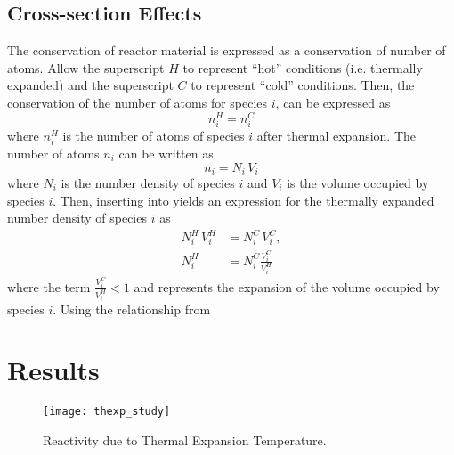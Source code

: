   \subsection{Cross-section Effects}
    The conservation of reactor material is expressed as a conservation of 
    number of atoms. Allow the superscript $H$ to represent ``hot'' conditions 
    (i.e.  thermally expanded) and the superscript $C$ to represent ``cold'' 
    conditions.  Then, the conservation of the number of atoms for species $i$, 
    can be expressed as
    \begin{equation}
      \label{eq:conservation}
      n_i^H = n_i^C 
    \end{equation}
    where $n_i^H$ is the number of atoms of species $i$ after thermal expansion.
    The number of atoms $n_i$ can be written as 
    \begin{equation}
      \label{eq:nden_definition}
      n_i = N_i \, V_i
    \end{equation}
    where $N_i$ is the number density of species $i$ and $V_i$ is the volume
    occupied by species $i$. Then, inserting  into 
     yields an expression for the thermally expanded 
    number density of species $i$ as
    \begin{align}
      N_i^H \, V_i^H &= N_i^C \, V_i^C, \\
      N_i^H &= N_i^C \frac{V_i^C}{V_i^H}
    \end{align}
    where the term $\frac{V_i^C}{V_i^H} < 1$ and represents the expansion of the
    volume occupied by species $i$. Using the relationship from


\section{Results}
  \begin{figure}
    \centering
    \texttt{[image: thexp\_study]}
    \caption{Reactivity due to Thermal Expansion Temperature.}
    \label{fig:thexp_study}
  \end{figure}

